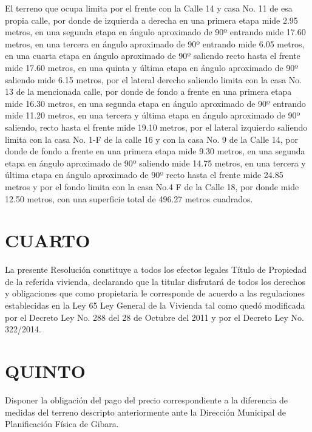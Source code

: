 \documentclass[11pt,letterpaper]{article}
\begin{document}
        El terreno que ocupa limita por el frente con la Calle 14 y casa No. 11 de esa propia calle, por donde de izquierda a derecha en una primera etapa mide 2.95 metros, en una segunda etapa en ángulo aproximado de 90º entrando mide 17.60 metros, en una tercera en ángulo aproximado de 90º entrando mide 6.05 metros, en una cuarta etapa en ángulo aproximado de 90º saliendo recto hasta el frente mide 17.60 metros, en una quinta y última etapa en ángulo aproximado de 90º saliendo mide 6.15 metros, por el lateral derecho saliendo limita con la casa No. 13 de la mencionada calle, por donde de fondo a frente en una primera etapa mide 16.30 metros, en una segunda etapa en ángulo aproximado de 90º entrando mide 11.20 metros, en una tercera y última etapa en ángulo aproximado de 90º saliendo, recto hasta el frente mide 19.10 metros, por el lateral izquierdo saliendo limita con la casa No. 1-F de la calle 16 y con la casa No. 9 de la Calle 14, por donde de fondo a frente en una primera etapa mide 9.30 metros, en una segunda etapa  en ángulo  aproximado de 90º saliendo mide 14.75 metros, en una tercera y última etapa en ángulo aproximado de 90º recto hasta el frente mide 24.85 metros y por el fondo limita con la casa No.4 F de la Calle 18, por donde mide 12.50 metros, con una superficie total de 496.27 metros cuadrados.
    \section{CUARTO}
        La presente Resolución constituye a todos los efectos legales Título de Propiedad de la referida vivienda, declarando que la titular disfrutará de todos los derechos y obligaciones que como propietaria le corresponde de acuerdo a las regulaciones establecidas en la Ley 65 Ley General de la Vivienda tal como quedó modificada por el Decreto Ley No. 288 del 28 de Octubre del 2011 y por el Decreto Ley No. 322/2014.
    \section{QUINTO}
        Disponer la obligación del pago del precio correspondiente a la diferencia de medidas del terreno descripto anteriormente ante la Dirección Municipal de Planificación Física de Gibara.
\end{document}
